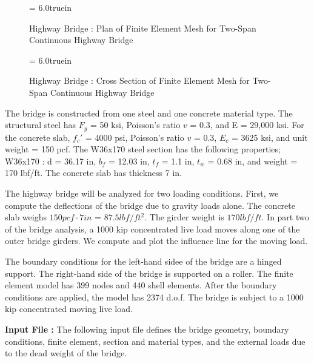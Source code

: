 \begin{figure}[t]
\epsfxsize= 6.0truein
\centerline{}
\vspace{0.20 in}
\caption{Highway Bridge : Plan of Finite Element Mesh for Two-Span Continuous Highway Bridge}
\label{fig: bridge-plan-of-mesh}
\end{figure}

\begin{figure}[t]
\epsfxsize= 6.0truein
\centerline{}
\vspace{0.20 in}
\caption{Highway Bridge : Cross Section of Finite Element Mesh for Two-Span Continuous Highway Bridge}
\label{fig: bridge-cross-section-of-mesh}
\end{figure}

\vspace{0.15 in}
\noindent\hspace{0.5 in}
The bridge is constructed from one steel and one concrete material type.
The structural steel has $F_y$ = 50 ksi,
Poisson's ratio $v$ = 0.3, and E = 29,000 ksi.
For the concrete slab, $f_c'$ = 4000 psi,
Poisson's ratio $v$ = 0.3, $E_c$ = 3625 ksi, 
and unit weight = 150 pcf.
The W36x170 steel section has the following properties;
W36x170 : d = 36.17 in,
$b_f$ = 12.03 in, $t_f$ = 1.1 in, $t_w$ = 0.68 in,
and weight = 170 lbf/ft.
The concrete slab has thickness 7 in.

\vspace{0.15 in}
\noindent\hspace{0.5 in}
The highway bridge will be analyzed for two loading conditions.
First, we compute the deflections of the bridge due to gravity loads alone.
The concrete slab weighs $150 pcf \cdot 7 in$ = $87.5 lbf/ft^2$.
The girder weight is $170 lbf/ft$.
In part two of the bridge analysis, a 1000 kip
concentrated live load moves along one of the outer bridge girders.
We compute and plot the influence line for the moving load.

\vspace{0.15 in}
\noindent\hspace{0.5 in}
The boundary conditions for the left-hand sidee of the bridge are a hinged support.
The right-hand side of the bridge is supported on a roller.
The finite element model has 399 nodes and 440 shell elements.
After the boundary conditions are applied, the model has 2374 d.o.f.
The bridge is subject to a 1000 kip concentrated moving live load.


\vspace{0.15 in}\noindent
{\bf Input File :} The following input file defines the bridge
geometry, boundary conditions, finite element, section and material types,
and the external loads due to the dead weight of the bridge.

